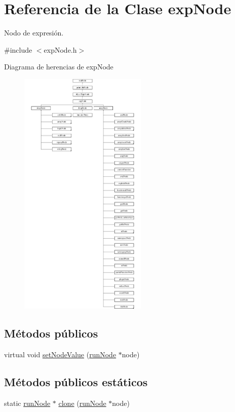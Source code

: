 \hypertarget{classexpNode}{\section{Referencia de la Clase exp\-Node}
\label{classexpNode}
}


Nodo de expresión.  




{\ttfamily \#include $<$exp\-Node.\-h$>$}

Diagrama de herencias de exp\-Node\begin{figure}[H]
\begin{center}
\leavevmode
\includegraphics[height=12.000000cm]{classexpNode}
\end{center}
\end{figure}
\subsection*{Métodos públicos}
\begin{DoxyCompactItemize}
\item 
virtual void \hyperlink{classexpNode_aedb96104889212bae315a6381f8e0219}{set\-Node\-Value} (\hyperlink{classrunNode}{run\-Node} $\ast$node)
\end{DoxyCompactItemize}
\subsection*{Métodos públicos estáticos}
\begin{DoxyCompactItemize}
\item 
static \hyperlink{classrunNode}{run\-Node} $\ast$ \hyperlink{classexpNode_aa3d0a7a138a2fc089232f9fadf33a629}{clone} (\hyperlink{classrunNode}{run\-Node} $\ast$node)
\end{DoxyCompactItemize}


